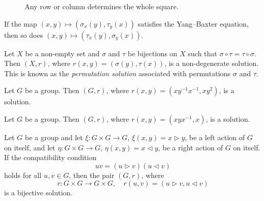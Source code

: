 \begin{figure}
\centering
{}
\caption{Any row or column determines the whole square.}
\label{fig:braid}
\end{figure}

\begin{example}
If the map $(x,y)\mapsto(\sigma_x(y),\tau_y(x))$ satisfies the Yang--Baxter equation, then 
so does $(x,y)\mapsto (\tau_x(y),\sigma_y(x))$. 
\end{example}

\begin{example}
\label{exa:Lyubashenko}
Let $X$ be a non-empty set and $\sigma$ and $\tau$ be 
bijections on $X$ such that $\sigma\circ\tau=\tau\circ\sigma$. Then 
$(X,r)$, where $r(x,y)=(\sigma(y),\tau(x))$, is a non-degenerate solution. 
This is known as the \emph{permutation solution} associated
with permutations $\sigma$ and $\tau$. 
\end{example}

\begin{example}
\label{exa:Wada}
Let $G$ be a group. Then $(G,r)$, where $r(x,y)=(xy^{-1}x^{-1},xy^2)$, is a solution. 
\end{example}

\begin{example}
\label{exa:Venkov}
Let $G$ be a group. Then $(G,r)$, where $r(x,y)=(xyx^{-1},x)$, is a solution. 
\end{example}

\begin{theorem}
\label{thm:LYZ}
Let $G$ be a group and let $\xi\colon G\times G\to G$, $\xi(x,y)=x\rhd y$,
be a left action of $G$ on itself, and 
let $\eta\colon G\times G\to G$, $\eta(x,y)=x\lhd y$, 
be a right action of $G$ on itself. If the compatibility condition
\[
uv=(u\rhd v)(u\lhd v)
\]
holds for all $u,v\in G$, then the pair $(G,r)$, where 
\[
r\colon G\times G\to G\times G,\quad
r(u,v)=(u\rhd v,u\lhd v)
\]
is a bijective solution. 
\end{theorem}

